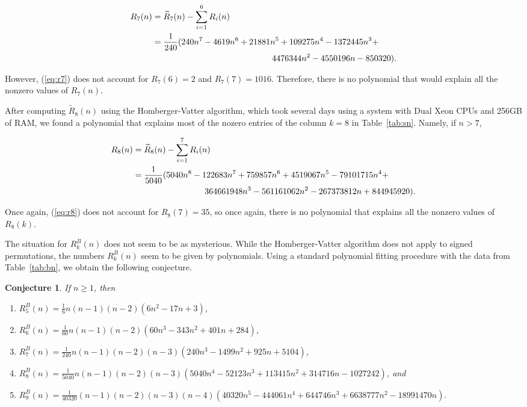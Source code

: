 \documentclass[final]{dmtcs-episciences}
\numberwithin{equation}{section}
\newtheorem{conjecture}[thm]{Conjecture}
\begin{document}
\begin{align}\label{eq:r7}
R_7(n)&=\widetilde{R}_7(n)-\sum_{i=1}^6R_i(n)\notag\\
&=\frac{1}{240} (240 n^7- 4619  n^6+21881 n^5+ 109275 n^4 -1372445 n^3+\notag\\
&\hspace{5cm} 4476344 n^2-4550196 n-850320).
\end{align}

However, (\ref{eq:r7}) does not account for $R_7(6)=2$ and $R_7(7)=1016$. Therefore, there is no polynomial that would explain all the nonzero values of $R_7(n)$. 

After computing $\widetilde{R}_8(n)$ using the Homberger-Vatter algorithm, which took several days using a system with Dual Xeon CPUs and 256GB of RAM, we found a polynomial that explains most of the nozero entries of the column $k=8$ in Table~\ref{tab:sn}. Namely, if $n>7$,

\begin{align}\label{eq:r8}
R_8(n)&=\widetilde{R}_8(n)-\sum_{i=1}^7R_i(n)\notag\\
&=\frac{1}{5040}(5040 n^8 - 122683 n^7 + 759857 n^6 + 4519067 n^5 -79101715 n^4 +\notag\\
  &\hspace{3cm}  364661948 n^3 - 561161062 n^2 - 267373812 n + 844945920).
\end{align}

Once again, (\ref{eq:r8}) does not account for $R_8(7)=35$, so once again, there is no polynomial that explains all the nonzero values of $R_8(k)$.

The situation for $R^B_k(n)$ does not seem to be as mysterious. While the Homberger-Vatter algorithm does not apply to signed permutations, the numbers $R^B_k(n)$ seem to be given by polynomials. Using a standard polynomial fitting procedure with the data from Table~\ref{tab:bn}, we obtain the following conjecture. 

\begin{conjecture}\label{con:bn} If $n\geq1$, then
\begin{enumerate}
    \item[(i)] $R^B_5(n)=\frac{1}{6}n(n-1)(n-2)(6n^2-17n+3)$,
    \item[(ii)] $R^B_6(n)=\frac{1}{60}n(n-1)(n-2)(60n^3-343n^2+401n+284)$,
    \item[(iii)] $R^B_7(n)=\frac{1}{240}n(n-1)(n-2)(n-3)(240n^3-1499n^2+925n+5104)$,
    \item[(iv)] $R^B_8(n)=\frac{1}{5040}n(n-1)(n-2)(n-3)(5040n^4-52123n^3+113415n^2+314716n-1027242)$, and
    \item[(v)] $R^B_9(n)=\frac{1}{40320}(n-1) (n-2) (n-3) (n-4) (40320 n^5-444061 n^4+644746 n^3+6638777 n^2-18991470 n).$
\end{enumerate}
\end{conjecture}
\end{document}

